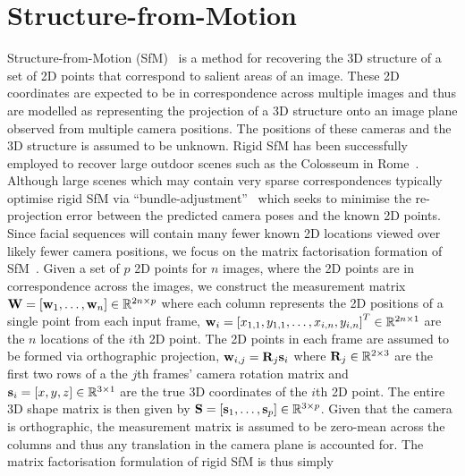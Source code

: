 \section{Structure-from-Motion}\label{sec:bg_sfm}
Structure-from-Motion (SfM)~\cite{ullman1979interpretation,tomasi1992shape,hartley2003multiple}
is a method for recovering the 3D structure of a set of 2D points that
correspond to salient areas of an image. These 2D coordinates are expected to be
in correspondence across multiple images and thus are modelled as representing
the projection of a 3D structure onto an image plane observed from multiple
camera positions. The positions of these cameras and the 3D structure is assumed
to be unknown. Rigid SfM has been successfully employed to recover large outdoor
scenes such as the Colosseum in Rome~\cite{agarwal2009building}. Although large
scenes which may contain very sparse correspondences typically optimise rigid
SfM via ``bundle-adjustment''~\cite{triggs1999bundle} which seeks to
minimise the re-projection error between the predicted camera poses and
the known 2D points. Since facial sequences will contain many fewer
known 2D locations viewed over likely fewer camera positions, we focus on
the matrix factorisation formation of SfM~\cite{tomasi1992shape}. Given
a set of $p$ 2D points for $n$ images, where the 2D points are in
correspondence across the images, we construct
the measurement matrix $\boldsymbol{\mathbf{W}} = [\boldsymbol{\mathbf{w}}_1, \ldots, \boldsymbol{\mathbf{w}}_n] \in \mathbb{R}^{2n \times p}$
where each column represents the 2D positions of a single point from each input frame,
$\boldsymbol{\mathbf{w}}_i = {[x_{1,1}, y_{1,1}, \ldots, x_{i,n}, y_{i,n}]}^T \in \mathbb{R}^{2n \times 1}$
are the $n$ locations of the $i$th 2D point. The 2D points
in each frame are assumed to be formed via orthographic projection,
$\boldsymbol{\mathbf{w}}_{i,j} = \boldsymbol{\mathbf{R}}_j \boldsymbol{\mathbf{s}}_i$ where $\boldsymbol{\mathbf{R}}_j \in \mathbb{R}^{2 \times 3}$ are the
first two rows of a the $j$th frames' camera rotation matrix and
$\boldsymbol{\mathbf{s}}_i = [x, y, z] \in \mathbb{R}^{3 \times 1}$ are
the true 3D coordinates of the $i$th 2D point. The entire 3D shape matrix
is then given by $\boldsymbol{\mathbf{S}} = [\boldsymbol{\mathbf{s}}_1, \ldots, \boldsymbol{\mathbf{s}}_p] \in \mathbb{R}^{3 \times p}$.
Given that the camera is orthographic, the measurement matrix is assumed to be
zero-mean across the columns and thus any translation in the camera plane is
accounted for. The matrix factorisation formulation of rigid SfM is thus simply
